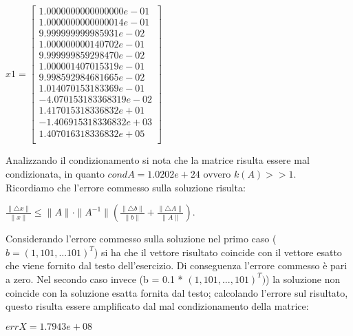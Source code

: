 \begin{flushleft}
\begin{center}
			$x1 = \begin{bmatrix}
				1.0000000000000000e-01\\
				1.0000000000000014e-01\\
				9.999999999985931e-02\\
				1.000000000140702e-01\\
				9.999999859298470e-02\\
				1.000001407015319e-01\\
				9.998592984681665e-02\\
				1.014070153183369e-01\\
				-4.070153183368319e-02\\
				1.417015318336832e+01\\
				-1.406915318336832e+03\\
				1.407016318336832e+05\\
			\end{bmatrix}$
	\end{center}
	Analizzando il condizionamento si nota che la matrice risulta essere mal condizionata, in quanto $condA = 1.0202e+24$ ovvero $k(A) >> 1$.\\
	Ricordiamo che l'errore commesso sulla soluzione risulta:
	\begin{center}
		$\frac{\|\triangle x\|}{\|x\|} \leq \|A\| \cdot \|A^{-1}\| (\frac{\|\triangle b\|}{\|b\|}+\frac{\|\triangle A\|}{\|A\|})$.
	\end{center}
	Considerando l'errore commesso sulla soluzione nel primo caso ($b = (1,101,...101)^{T}$) si ha che il vettore risultato coincide con il vettore esatto che viene fornito dal testo dell'esercizio. Di conseguenza l'errore commesso è pari a zero. Nel secondo caso invece (b = 0.1 * $(1,101,...,101)^{T})$) la soluzione non coincide con la soluzione esatta fornita dal testo; calcolando l'errore sul risultato, questo risulta essere amplificato dal mal condizionamento della matrice:
	\begin{center}
	$errX = 1.7943e+08$
	\end{center}
\end{flushleft}
